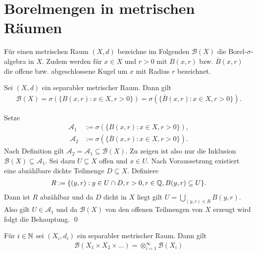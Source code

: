 \section{Borelmengen in metrischen Räumen}
Für einen metrischen Raum $(X,d)$ bezeichne im Folgenden $\mathcal{B}(X)$ die Borel-$\sigma$-algebra in $X$. 
Zudem werden für $x \in X$ und $r>0$ mit $B(x, r)$ bzw. $\overline{B}(x,r)$ die offene bzw. abgeschlossene Kugel um $x$ mit Radius $r$ bezeichnet.
\begin{proposition}
    Sei $(X,d)$ ein separabler metrischer Raum. Dann gilt
    \begin{align*}
        \mathcal{B}(X) = \sigma(\{B(x,r): x \in X, r > 0 \}) = \sigma(\{\bar{B}(x,r): x \in X, r > 0 \}). 
    \end{align*}
\end{proposition}
\begin{proof*}
    Setze 
    \begin{align*}
        \mathcal{A}_1 &:= \sigma(\{B(x,r): x \in X, r > 0 \}), \\\ 
        \mathcal{A}_2 &:= \sigma(\{\overline{B}(x,r): x \in X, r > 0 \}). 
    \end{align*}
    Nach  Definition gilt $\mathcal{A}_2 = \mathcal{A}_1 \subseteq \mathcal{B}(X)$. Zu zeigen ist also nur die Inklusion $\mathcal{B}(X) \subseteq \mathcal{A}_1$.
    Sei dazu $U \subseteq X$ offen und $x \in U$. Nach Voraussetzung existiert eine abzählbare dichte Teilmenge $D \subseteq X$. Definiere 
    \begin{align*}
        R := \{(y,r) : y \in U \cap D, r > 0, r \in \mathbb{Q}, B(y,r) \subseteq U \}.
    \end{align*}
    Dann ist $R$ abzählbar und da $D$ dicht in $X$ liegt gilt $U = \bigcup_{(y,r) \in R}B(y,r)$. 
    Also gilt $U \in \mathcal{A}_1$ und da $\mathcal{B}(X)$ von den offenen Teilmengen von $X$ erzeugt wird folgt die Behauptung. \qed
\end{proof*}

\begin{proposition}
    Für $i \in \mathbb{N}$ sei $(X_i, d_i)$ ein separabler metrischer Raum. Dann gilt
    \begin{align*}
        \mathcal{B}(X_1 \times X_2 \times ...) = \otimes_{i=1}^{\infty}\mathcal{B}(X_i)
    \end{align*}
\end{proposition}

